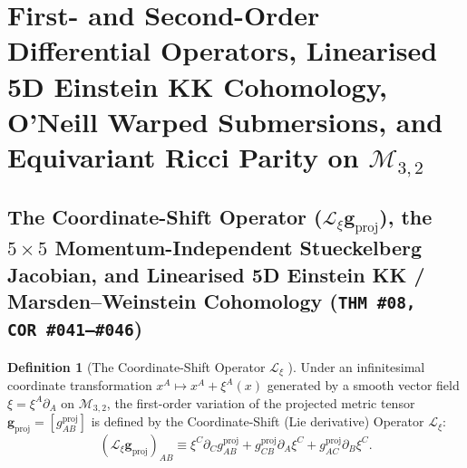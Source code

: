 \documentclass[11pt,a4paper]{article}
\newcommand{\catD}{\text{\textbf{\textcolor{blue!75!black}{[D]}}}}
\theoremstyle{definition}
\newtheorem{definition}[axiom]{Definition}
\theoremstyle{plain}
\theoremstyle{remark}
\begin{document}
\section{\texorpdfstring{First- and Second-Order Differential Operators, Linearised 5D Einstein KK Cohomology, O'Neill Warped Submersions, and Equivariant Ricci Parity on $\mathcal{M}_{3,2}$ \catD}{First- and Second-Order Differential Operators, Linearised 5D Einstein KK Cohomology, O'Neill Warped Submersions, and Equivariant Ricci Parity on M\_\{3,2\}}}
\label{sec:c2_differential_operators}

\subsection{\texorpdfstring{The Coordinate-Shift Operator ($\mathcal{L}_\xi \mathbf{g}_{\mathrm{proj}}$), the $5\times 5$ Momentum-Independent Stueckelberg Jacobian, and Linearised 5D Einstein KK / Marsden--Weinstein Cohomology (\texttt{THM~\#08, COR~\#041--\#046})}{The Coordinate-Shift Operator, the 5x5 Stueckelberg Jacobian, and Linearised 5D Einstein KK / Marsden-Weinstein Cohomology}}

\begin{definition}[The Coordinate-Shift Operator $\mathcal{L}_\xi$ \catD]\label{def:c2_coord_shift}
Under an infinitesimal coordinate transformation $x^A \mapsto x^A + \xi^A(x)$ generated by a smooth vector field $\xi = \xi^A \partial_A$ on $\mathcal{M}_{3,2}$, the first-order variation of the projected metric tensor $\mathbf{g}_{\mathrm{proj}} = [g_{AB}^{\mathrm{proj}}]$ is defined by the Coordinate-Shift (Lie derivative) Operator $\mathcal{L}_\xi$:
\begin{equation}\label{eq:c2_coord_shift_def}
\left(\mathcal{L}_\xi \mathbf{g}_{\mathrm{proj}}\right)_{AB} \equiv \xi^C \partial_C g_{AB}^{\mathrm{proj}} + g_{CB}^{\mathrm{proj}} \partial_A \xi^C + g_{AC}^{\mathrm{proj}} \partial_B \xi^C.
\end{equation}
\end{definition}
\end{document}

